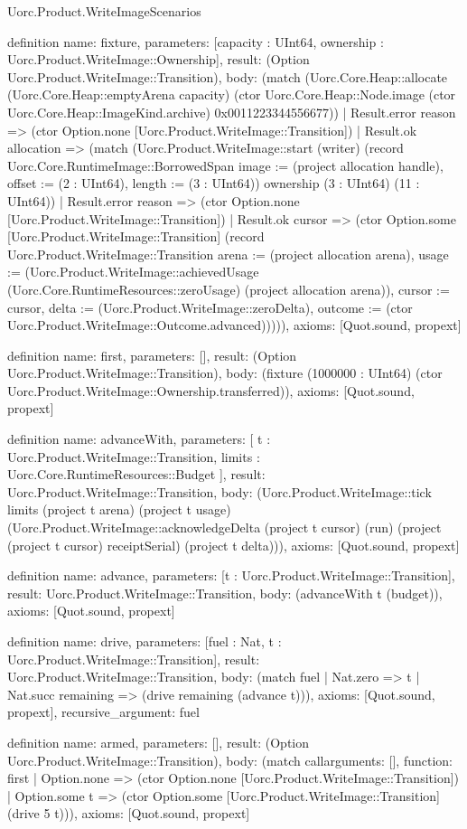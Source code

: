 \begin{lexlean}{Uorc.Product.WriteImageScenarios}
\begin{semanticmodule}
definition{
  name: fixture,
  parameters: [capacity : UInt64, ownership : Uorc.Product.WriteImage::Ownership],
  result: (Option Uorc.Product.WriteImage::Transition),
  body: (match (Uorc.Core.Heap::allocate (Uorc.Core.Heap::emptyArena capacity) (ctor Uorc.Core.Heap::Node.image (ctor Uorc.Core.Heap::ImageKind.archive) 0x0011223344556677))
    | Result.error reason => (ctor Option.none [Uorc.Product.WriteImage::Transition])
    | Result.ok allocation => (match (Uorc.Product.WriteImage::start (writer) (record Uorc.Core.RuntimeImage::BorrowedSpan {image := (project allocation handle), offset := (2 : UInt64), length := (3 : UInt64)}) ownership (3 : UInt64) (11 : UInt64))
      | Result.error reason => (ctor Option.none [Uorc.Product.WriteImage::Transition])
      | Result.ok cursor => (ctor Option.some [Uorc.Product.WriteImage::Transition] (record Uorc.Product.WriteImage::Transition {arena := (project allocation arena), usage := (Uorc.Product.WriteImage::achievedUsage (Uorc.Core.RuntimeResources::zeroUsage) (project allocation arena)), cursor := cursor, delta := (Uorc.Product.WriteImage::zeroDelta), outcome := (ctor Uorc.Product.WriteImage::Outcome.advanced)})))),
  axioms: [Quot.sound, propext]
}

definition{
  name: first,
  parameters: [],
  result: (Option Uorc.Product.WriteImage::Transition),
  body: (fixture (1000000 : UInt64) (ctor Uorc.Product.WriteImage::Ownership.transferred)),
  axioms: [Quot.sound, propext]
}

definition{
  name: advanceWith,
  parameters: [
    t : Uorc.Product.WriteImage::Transition,
    limits : Uorc.Core.RuntimeResources::Budget
  ],
  result: Uorc.Product.WriteImage::Transition,
  body: (Uorc.Product.WriteImage::tick limits (project t arena) (project t usage) (Uorc.Product.WriteImage::acknowledgeDelta (project t cursor) (run) (project (project t cursor) receiptSerial) (project t delta))),
  axioms: [Quot.sound, propext]
}

definition{
  name: advance,
  parameters: [t : Uorc.Product.WriteImage::Transition],
  result: Uorc.Product.WriteImage::Transition,
  body: (advanceWith t (budget)),
  axioms: [Quot.sound, propext]
}

definition{
  name: drive,
  parameters: [fuel : Nat, t : Uorc.Product.WriteImage::Transition],
  result: Uorc.Product.WriteImage::Transition,
  body: (match fuel | Nat.zero => t | Nat.succ remaining => (drive remaining (advance t))),
  axioms: [Quot.sound, propext],
  recursive_argument: fuel
}

definition{
  name: armed,
  parameters: [],
  result: (Option Uorc.Product.WriteImage::Transition),
  body: (match call{arguments: [], function: first}
    | Option.none => (ctor Option.none [Uorc.Product.WriteImage::Transition])
    | Option.some t => (ctor Option.some [Uorc.Product.WriteImage::Transition] (drive 5 t))),
  axioms: [Quot.sound, propext]
}


\end{semanticmodule}
\end{lexlean}
